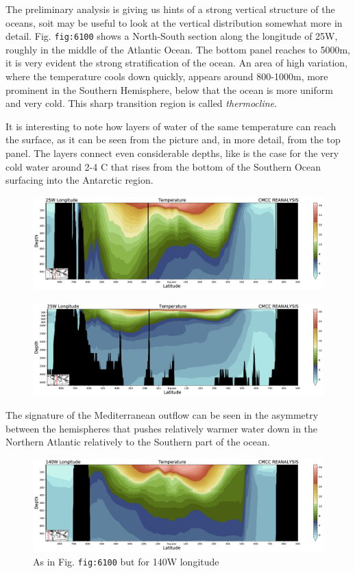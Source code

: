 The preliminary analysis is giving us hints of a strong vertical
structure of the oceans, soit may be useful to look at the vertical
distribution somewhat more in detail. Fig. \texttt{fig:6100} shows a
North-South section along the longitude of 25W, roughly in the middle of
the Atlantic Ocean. The bottom panel reaches to 5000m, it is very
evident the strong stratification of the ocean. An area of high
variation, where the temperature cools down quickly, appears around
800-1000m, more prominent in the Southern Hemisphere, below that the
ocean is more uniform and very cold. This sharp transition region is
called \emph{thermocline}.

It is interesting to note how layers of water of the same temperature
can reach the surface, as it can be seen from the picture and, in more
detail, from the top panel. The layers connect even considerable depths,
like is the case for the very cold water around 2-4 C that rises from
the bottom of the Southern Ocean surfacing into the Antarctic region.

\begin{figure}
\centering
\includegraphics[width = .7 \textwidth]{figs/GD/Sect25W1000.png}
\caption{} \label{fig:}
\end{figure}

\begin{figure}
\centering
\includegraphics[width = .7 \textwidth]{figs/GD/Sect25W5000.png}
\caption{} \label{fig:}
\end{figure}

The signature of the Mediterranean outflow can be seen in the asymmetry
between the hemispheres that pushes relatively warmer water down in the
Northern Atlantic relatively to the Southern part of the ocean.

\begin{figure}
\centering
\includegraphics[width = .7 \textwidth]{figs/GD/Sect140W1000.png}
\caption{As in Fig. \texttt{fig:6100} but for 140W longitude}
\end{figure}

